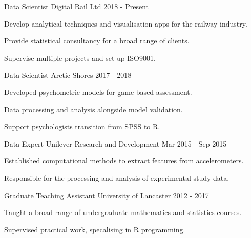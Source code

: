 \begin{cventries}
      
    \cventry
    {Data Scientist}
    {Digital Rail Ltd}
    {}
    {2018 - Present}
    {
      \begin{cvitems}
        \item Develop analytical techniques and visualisation apps for the railway industry.
        \item Provide statistical consultancy for a broad range of clients.
        \item Supervise multiple projects and set up ISO9001.
      \end{cvitems}
    }  
      
     \cventry
    {Data Scientist}
    {Arctic Shores}
    {}
    {2017 - 2018}
    {
      \begin{cvitems}
        \item Developed psychometric models for game-based assessment.
         \item Data processing and analysis alongside model validation.
         \item Support psychologists transition from SPSS to R.
      \end{cvitems}
    }

  \cventry
    {Data Expert}
    {Unilever Research and Development}
    {}
    {Mar 2015 - Sep 2015}
    {
      \begin{cvitems}
        \item Established computational methods to extract features from accelerometers.
        \item Responsible for the processing and analysis of experimental study data.
      \end{cvitems}
    }
    
    \cventry
    {Graduate Teaching Assistant}
    {University of Lancaster}
    {}
    {2012 - 2017}
    {
      \begin{cvitems}
        \item Taught a broad range of undergraduate mathematics and statistics courses.
         \item Supervised practical work, specalising in R programming.
      \end{cvitems}
    }
\end{cventries}
